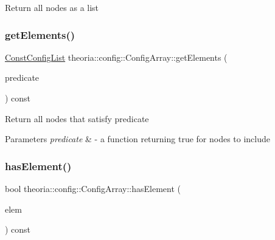 Return all nodes as a list \mbox{\label{classtheoria_1_1config_1_1ConfigArray_a45cf4c898888e5ec602d4f21ab603687}} 
\subsubsection{\texorpdfstring{get\+Elements()}{getElements()}\hspace{0.1cm}{\footnotesize\ttfamily [2/2]}}
{\footnotesize\ttfamily \hyperlink{classtheoria_1_1config_1_1Config_a61230728ffa4d92667a536c8c0f0ca30}{Const\+Config\+List} theoria\+::config\+::\+Config\+Array\+::get\+Elements (\begin{DoxyParamCaption}\item[{const \hyperlink{classtheoria_1_1config_1_1Config_a293ebfd7146d935e232a066f7e6fa279}{Config\+Predicate} \&}]{predicate }\end{DoxyParamCaption}) const\hspace{0.3cm}{\ttfamily [inline]}}

Return all nodes that satisfy predicate 
\begin{DoxyParams}{Parameters}
{\em predicate} & -\/ a function returning true for nodes to include \\
\hline
\end{DoxyParams}
\mbox{\label{classtheoria_1_1config_1_1ConfigArray_a61157dd8ee35ba02a64859d5ccf59ba6}} 
\subsubsection{\texorpdfstring{has\+Element()}{hasElement()}}
{\footnotesize\ttfamily bool theoria\+::config\+::\+Config\+Array\+::has\+Element (\begin{DoxyParamCaption}\item[{const \hyperlink{classtheoria_1_1config_1_1Config}{Config} $\ast$}]{elem }\end{DoxyParamCaption}) const\hspace{0.3cm}{\ttfamily [inline]}}

